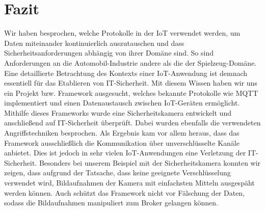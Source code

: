 \section{Fazit}
Wir haben besprochen, welche Protokolle in der IoT verwendet werden, um Daten
miteinander kontinuierlich auszutauschen und dass Sicherheitsanforderungen
abhängig von ihrer Domäne sind. So sind Anforderungen an die Automobil-Industrie
andere als die der Spielzeug-Domäne. Eine detaillierte Betrachtung des Kontexts
einer IoT-Anwendung ist demnach essentiell für das Etablieren von IT-Sicherheit.
Mit diesem Wissen haben wir uns ein Projekt bzw. Framework ausgesucht, welches
bekannte Protokolle wie MQTT implementiert und einen Datenaustausch zwischen
IoT-Geräten ermöglicht. Mithilfe dieses Frameworks wurde eine Sicherheitskamera
entwickelt und anschließend auf IT-Sicherheit überprüft. Dabei wurden ebenfalls
die verwendeten Angriffstechniken besprochen. Als Ergebnis kam vor allem heraus,
dass das Framework ausschließlich die Kommunikation über unverschlüsselte Kanäle
anbietet. Dies ist jedoch in sehr vielen IoT-Anwendungen eine Verletzung der
IT-Sicherheit. Besonders bei unserem Beispiel mit der Sicherheitskamera konnten
wir zeigen, dass aufgrund der Tatsache, dass keine geeignete Verschlüsselung
verwendet wird, Bildaufnahmen der Kamera mit einfachsten Mitteln ausgespäht
werden können. Auch schützt das Framework nicht vor Fälschung der Daten, sodass
die Bildaufnahmen manipuliert zum Broker gelangen können.
